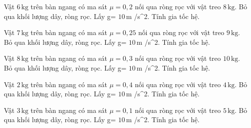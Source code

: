 \begin{ex}
Vật $6\,\text{kg}$ trên bàn ngang có ma sát $\mu=0,2$ nối qua ròng rọc với vật treo $8\,\text{kg}$. Bỏ qua khối lượng dây, ròng rọc. Lấy g= $10\,\text{m}$ /s^2. Tính gia tốc hệ.
\end{ex}

\begin{bt}
Vật $7\,\text{kg}$ trên bàn ngang có ma sát $\mu=0,25$ nối qua ròng rọc với vật treo $9\,\text{kg}$. Bỏ qua khối lượng dây, ròng rọc. Lấy g= $10\,\text{m}$ /s^2. Tính gia tốc hệ.
\end{bt}

\begin{bt}
Vật $8\,\text{kg}$ trên bàn ngang có ma sát $\mu=0,3$ nối qua ròng rọc với vật treo $10\,\text{kg}$. Bỏ qua khối lượng dây, ròng rọc. Lấy g= $10\,\text{m}$ /s^2. Tính gia tốc hệ.
\end{bt}

\begin{bt}
Vật $2\,\text{kg}$ trên bàn ngang có ma sát $\mu=0,4$ nối qua ròng rọc với vật treo $4\,\text{kg}$. Bỏ qua khối lượng dây, ròng rọc. Lấy g= $10\,\text{m}$ /s^2. Tính gia tốc hệ.
\end{bt}

\begin{bt}
Vật $3\,\text{kg}$ trên bàn ngang có ma sát $\mu=0,1$ nối qua ròng rọc với vật treo $5\,\text{kg}$. Bỏ qua khối lượng dây, ròng rọc. Lấy g= $10\,\text{m}$ /s^2. Tính gia tốc hệ.
\end{bt}

